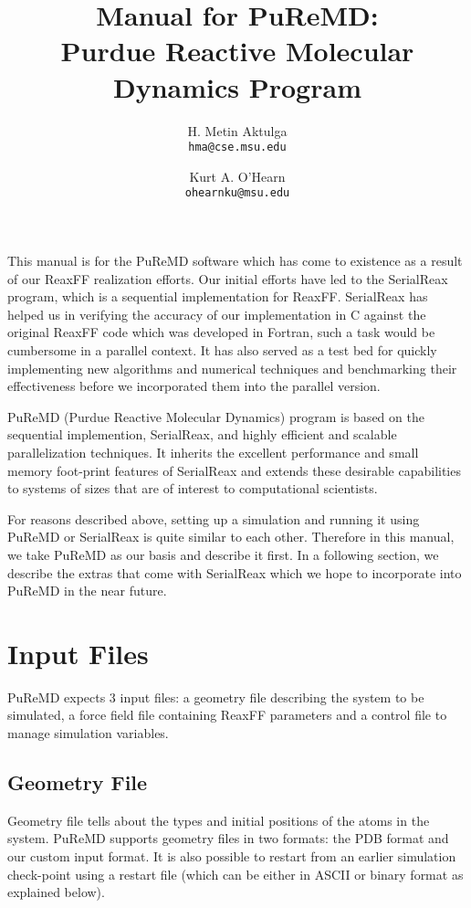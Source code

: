\documentclass{article}
\title{Manual for PuReMD: \\
  {\bf Pu}rdue {\bf Re}active {\bf M}olecular {\bf D}ynamics Program}
\author{
  H. Metin Aktulga \\
  \texttt{hma@cse.msu.edu} \\
  \and
  Kurt A. O'Hearn \\
  \texttt{ohearnku@msu.edu}
}
\begin{document}
\maketitle

This manual is for the PuReMD software which has
come to existence as a result of our ReaxFF realization efforts. 
Our initial efforts have led to the SerialReax program, which is a 
sequential implementation for ReaxFF. SerialReax has helped us in verifying 
the accuracy of our implementation in C against the original ReaxFF code 
which was developed in Fortran, such a task would be cumbersome in a parallel 
context. It has also served as a test bed for quickly implementing new 
algorithms and numerical techniques and benchmarking their effectiveness 
before we incorporated them into the parallel version.

PuReMD (Purdue Reactive Molecular Dynamics) program is based on the 
sequential implemention, SerialReax, and highly efficient and scalable
parallelization techniques. It inherits the excellent 
performance and small memory foot-print features of SerialReax and 
extends these desirable capabilities to systems of sizes that are of
interest to computational scientists. 

For reasons described above, setting up a simulation and running it using 
PuReMD or SerialReax is quite similar to each other. Therefore in this 
manual, we take PuReMD as our basis and describe it first. In a following 
section, we describe the extras that come with SerialReax which we hope 
to incorporate into PuReMD in the near future.


\section{Input Files}
\label{sec:puremd_inp}

PuReMD expects 3 input files: a geometry file describing the system to be 
simulated, a force field file containing ReaxFF parameters and a control 
file to manage simulation variables.


\subsection{Geometry File}
\label{sec:puremd_geo}

Geometry file tells about the types and initial positions of the atoms 
in the system. PuReMD supports geometry files in two formats: 
the PDB format and our custom input format. It is also possible to 
restart from an earlier simulation check-point using a restart file
(which can be either in ASCII or binary format as explained below). 
\end{document}
